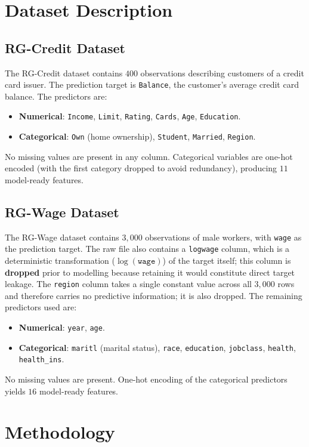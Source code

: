 \documentclass[11pt]{article}
\begin{document}
\section{Dataset Description}

\subsection{RG-Credit Dataset}
The RG-Credit dataset contains $400$ observations describing customers of a credit card issuer. The prediction target is \texttt{Balance}, the customer's average credit card balance. The predictors are:
\begin{itemize}
  \item \textbf{Numerical}: \texttt{Income}, \texttt{Limit}, \texttt{Rating}, \texttt{Cards}, \texttt{Age}, \texttt{Education}.
  \item \textbf{Categorical}: \texttt{Own} (home ownership), \texttt{Student}, \texttt{Married}, \texttt{Region}.
\end{itemize}
No missing values are present in any column. Categorical variables are one-hot encoded (with the first category dropped to avoid redundancy), producing $11$ model-ready features.

\subsection{RG-Wage Dataset}
The RG-Wage dataset contains $3{,}000$ observations of male workers, with \texttt{wage} as the prediction target. The raw file also contains a \texttt{logwage} column, which is a deterministic transformation ($\log(\texttt{wage})$) of the target itself; this column is \textbf{dropped} prior to modelling because retaining it would constitute direct target leakage. The \texttt{region} column takes a single constant value across all $3{,}000$ rows and therefore carries no predictive information; it is also dropped. The remaining predictors used are:
\begin{itemize}
  \item \textbf{Numerical}: \texttt{year}, \texttt{age}.
  \item \textbf{Categorical}: \texttt{maritl} (marital status), \texttt{race}, \texttt{education}, \texttt{jobclass}, \texttt{health}, \texttt{health\_ins}.
\end{itemize}
No missing values are present. One-hot encoding of the categorical predictors yields $16$ model-ready features.

\section{Methodology}
\end{document}

